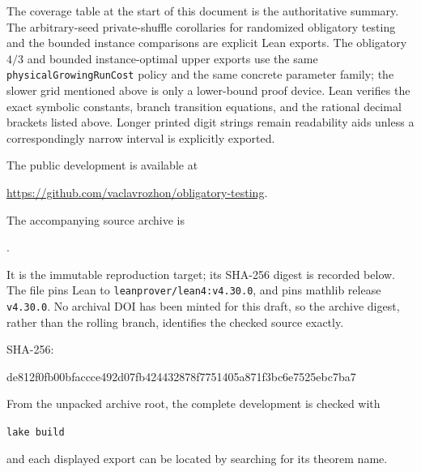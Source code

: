 The coverage table at the start of this document is the authoritative
summary.  The arbitrary-seed private-shuffle corollaries for randomized
obligatory testing and the bounded instance comparisons are explicit Lean
exports.  The obligatory $4/3$ and bounded instance-optimal upper exports use
the same \texttt{physicalGrowingRunCost} policy and the same concrete
parameter family; the slower grid mentioned above is only a lower-bound
proof device.  Lean verifies the exact symbolic constants, branch transition
equations, and the rational decimal brackets listed above.  Longer printed
digit strings remain readability aids unless a correspondingly narrow
interval is explicitly exported.

The public development is available at
\begin{center}
\url{https://github.com/vaclavrozhon/obligatory-testing}.
\end{center}
The accompanying source archive is
\begin{center}
.
\end{center}
It is the immutable reproduction target; its SHA-256 digest is recorded
below.  The file  pins Lean to
\texttt{leanprover/lean4:v4.30.0}, and  pins mathlib
release \texttt{v4.30.0}.  No archival DOI has been
minted for this draft, so the archive digest, rather than the rolling branch,
identifies the checked source exactly.

\begin{center}
\small\ttfamily
SHA-256:\par
de812f0fb00bfaccce492d07fb424432878f7751405a871f3bc6e7525ebc7ba7
\end{center}

From the unpacked archive root, the complete development is checked with
\begin{center}
\texttt{lake build}
\end{center}
and each displayed export can be located by searching for its theorem name.
